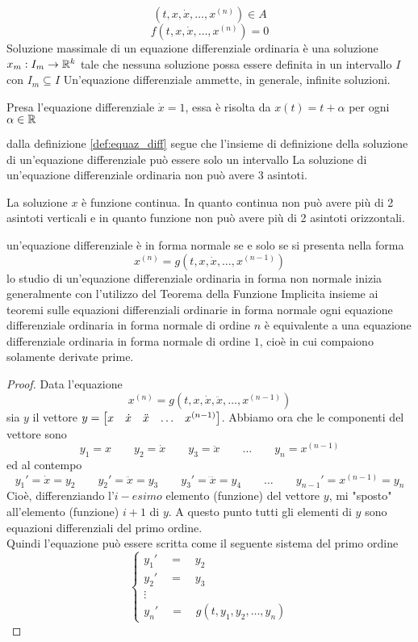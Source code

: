 $$ (t,x,\dot{x},\ldots,x^{(n)}) \in A$$
$$ f(t,x,\dot{x},\ldots,x^{(n)})=0$$
Soluzione massimale  di un equazione differenziale ordinaria è una soluzione $x_m:I_m\to \mathbb{R}^k$ tale che nessuna soluzione possa essere definita in un intervallo $I$ con $I_m\subseteq I$
\note
Un'equazione differenziale ammette, in generale, infinite soluzioni.
\begin{example}
	Presa l'equazione differenziale $\dot{x}=1$, essa è risolta da $x(t) = t + \alpha$ per ogni $\alpha\in\mathbb{R}$
\end{example}
\note
dalla definizione \ref{def:equaz_diff} segue che l'insieme di definizione della soluzione di un'equazione differenziale può essere solo un intervallo
\exercise
La soluzione di un'equazione differenziale ordinaria non può avere 3 asintoti.
\begin{exercise_answer}
	La soluzione $x$ è funzione continua. In quanto continua non può avere più di 2 asintoti verticali e in quanto funzione non può avere più di 2 asintoti orizzontali.
\end{exercise_answer}
un'equazione differenziale è in forma normale  se e solo se si presenta nella forma 
$$x^{(n)} = g(t,x,\dot{x},\ldots,x^{(n-1)})$$
\observation
lo studio di un'equazione differenziale ordinaria in forma non normale inizia generalmente con l'utilizzo del Teorema della Funzione Implicita insieme ai teoremi sulle equazioni differenziali ordinarie in forma normale
\proposition
ogni equazione differenziale ordinaria in forma normale di ordine $n$ è equivalente a una equazione differenziale ordinaria in forma normale di ordine $1$, cioè in cui compaiono solamente derivate prime.
\begin{proof}
	Data l'equazione
	$$x^{(n)} = g(t,x,\dot{x},\ddot{x},\ldots,x^{(n-1)})$$
	sia $y$ il vettore $y = \begin{bmatrix} x & \dot{x} & \ddot{x} & \ldots & x^{(n-1)} \end{bmatrix}$. Abbiamo ora che le componenti del vettore sono
	$$y_1=x\qquad y_2=\dot{x}\qquad y_3=\ddot{x}\qquad \ldots\qquad y_n=x^{(n-1)}$$
	ed al contempo
	$$y_1'=\dot{x}=y_2\qquad y_2'=\ddot{x}=y_3\qquad y_3'=\dddot{x}=y_4\qquad\ldots\qquad y_{n-1}'=x^{(n-1)}=y_n$$
	Cioè, differenziando l'$i-esimo$ elemento (funzione) del vettore $y$, mi "sposto" all'elemento (funzione) $i+1$ di $y$. A questo punto tutti gli elementi di $y$ sono equazioni differenziali del primo ordine.\\
	Quindi l'equazione può essere scritta come il seguente sistema del primo ordine
	$$\begin{cases}y_1'\quad=\quad y_2\\y_2'\quad=\quad y_3\\\vdots\\y_n'\quad=\quad g(t, y_1, y_2,\dots,y_n)\end{cases}$$
\end{proof}
